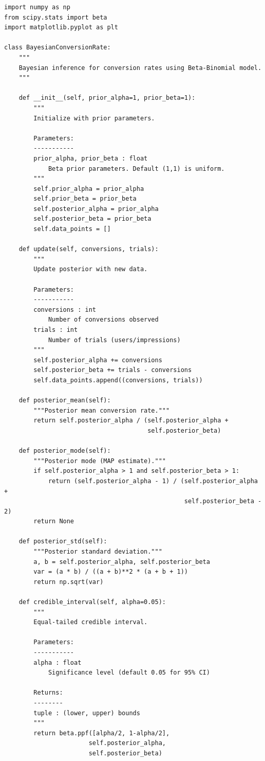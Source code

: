 \lstset{language=Python, caption=Beta-Binomial Bayesian Inference}
\begin{lstlisting}
import numpy as np
from scipy.stats import beta
import matplotlib.pyplot as plt

class BayesianConversionRate:
    """
    Bayesian inference for conversion rates using Beta-Binomial model.
    """

    def __init__(self, prior_alpha=1, prior_beta=1):
        """
        Initialize with prior parameters.

        Parameters:
        -----------
        prior_alpha, prior_beta : float
            Beta prior parameters. Default (1,1) is uniform.
        """
        self.prior_alpha = prior_alpha
        self.prior_beta = prior_beta
        self.posterior_alpha = prior_alpha
        self.posterior_beta = prior_beta
        self.data_points = []

    def update(self, conversions, trials):
        """
        Update posterior with new data.

        Parameters:
        -----------
        conversions : int
            Number of conversions observed
        trials : int
            Number of trials (users/impressions)
        """
        self.posterior_alpha += conversions
        self.posterior_beta += trials - conversions
        self.data_points.append((conversions, trials))

    def posterior_mean(self):
        """Posterior mean conversion rate."""
        return self.posterior_alpha / (self.posterior_alpha +
                                       self.posterior_beta)

    def posterior_mode(self):
        """Posterior mode (MAP estimate)."""
        if self.posterior_alpha > 1 and self.posterior_beta > 1:
            return (self.posterior_alpha - 1) / (self.posterior_alpha +
                                                 self.posterior_beta - 2)
        return None

    def posterior_std(self):
        """Posterior standard deviation."""
        a, b = self.posterior_alpha, self.posterior_beta
        var = (a * b) / ((a + b)**2 * (a + b + 1))
        return np.sqrt(var)

    def credible_interval(self, alpha=0.05):
        """
        Equal-tailed credible interval.

        Parameters:
        -----------
        alpha : float
            Significance level (default 0.05 for 95% CI)

        Returns:
        --------
        tuple : (lower, upper) bounds
        """
        return beta.ppf([alpha/2, 1-alpha/2],
                       self.posterior_alpha,
                       self.posterior_beta)


\end{lstlisting}
